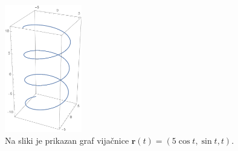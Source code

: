 \documentclass[12pt,a4paper,twoside]{article}
\theoremstyle{definition} %
\theoremstyle{plain} %
\theoremstyle{primerstyle}
\numberwithin{equation}{section}  %
\newcommand{\rV}{\mathbf{r}}
\begin{document}
\begin{figure}[h!]
	  \centering
	  \includegraphics[width=0.3\textwidth]{images/simple_helix.pdf}
	  \caption[Primer preproste vijačnice]{Na sliki je prikazan graf vijačnice $\rV(t)=(5\cos{t},\sin{t},t).$}
	  \label{fig:simple_helix}
	\end{figure}
\end{document}
